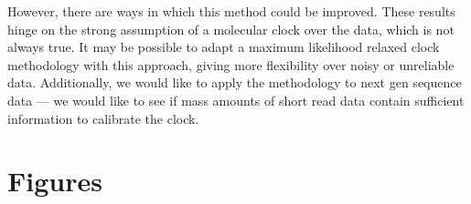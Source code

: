 \documentclass[12pt]{article}
\begin{document}
However, there are ways in which this method could be improved. 
These results hinge on the strong assumption of a molecular clock over the data, which is not always true. 
It may be possible to adapt a maximum likelihood relaxed clock methodology with this approach, giving more flexibility over noisy or unreliable data. 
Additionally, we would like to apply the methodology to next gen sequence data --- we would like to see if mass amounts of short read data contain sufficient information to calibrate the clock.



\clearpage





\clearpage


\section * {Figures}
\end{document}
